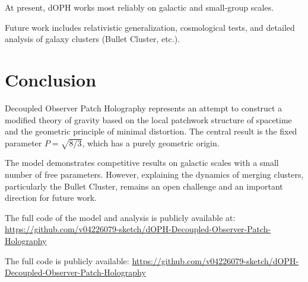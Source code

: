 \documentclass[12pt,a4paper]{article}
\begin{document}
At present, dOPH works most reliably on galactic and small-group scales.

Future work includes relativistic generalization, cosmological tests, and detailed analysis of galaxy clusters (Bullet Cluster, etc.).

\section{Conclusion}

Decoupled Observer Patch Holography represents an attempt to construct a modified theory of gravity based on the local patchwork structure of spacetime and the geometric principle of minimal distortion. The central result is the fixed parameter \(P = \sqrt{8/3}\), which has a purely geometric origin.

The model demonstrates competitive results on galactic scales with a small number of free parameters. However, explaining the dynamics of merging clusters, particularly the Bullet Cluster, remains an open challenge and an important direction for future work.

The full code of the model and analysis is publicly available at:  
\url{https://github.com/v04226079-sketch/dOPH-Decoupled-Observer-Patch-Holography}

The full code is publicly available: \url{https://github.com/v04226079-sketch/dOPH-Decoupled-Observer-Patch-Holography}
\end{document}
